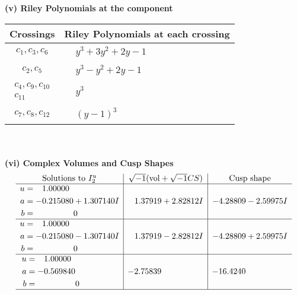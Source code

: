 \documentclass[1p]{elsarticle_modified}
\theoremstyle{definition}
\newcommand{\I}{\sqrt{-1}}
\begin{document}
\newpage\renewcommand{\arraystretch}{1}
\flushleft \textbf{(v) Riley Polynomials at the component}\newline \\
\begin{tabular}{m{50pt}|m{274pt}}
Crossings & \hspace{64pt}Riley Polynomials at each crossing \\
\hline $$\begin{aligned}c_{1},c_{3},c_{6}\end{aligned}$$&$\begin{aligned}
&y^3+3 y^2+2 y-1
\end{aligned}$\\
\hline $$\begin{aligned}c_{2},c_{5}\end{aligned}$$&$\begin{aligned}
&y^3- y^2+2 y-1
\end{aligned}$\\
\hline $$\begin{aligned}c_{4},c_{9},c_{10}\\c_{11}\end{aligned}$$&$\begin{aligned}
&y^3
\end{aligned}$\\
\hline $$\begin{aligned}c_{7},c_{8},c_{12}\end{aligned}$$&$\begin{aligned}
&(y-1)^3
\end{aligned}$\\
\hline
\end{tabular}\\~\\
\newpage\flushleft \textbf{(vi) Complex Volumes and Cusp Shapes}
$$\begin{array}{c|c|c}  
\text{Solutions to }I^u_{2}& \I (\text{vol} + \sqrt{-1}CS) & \text{Cusp shape}\\
 \hline 
\begin{aligned}
u &= \phantom{-}1.00000\phantom{ +0.000000I} \\
a &= -0.215080 + 1.307140 I \\
b &= \phantom{-0.000000 } 0\end{aligned}
 & \phantom{-}1.37919 + 2.82812 I & -4.28809 - 2.59975 I \\ \hline\begin{aligned}
u &= \phantom{-}1.00000\phantom{ +0.000000I} \\
a &= -0.215080 - 1.307140 I \\
b &= \phantom{-0.000000 } 0\end{aligned}
 & \phantom{-}1.37919 - 2.82812 I & -4.28809 + 2.59975 I \\ \hline\begin{aligned}
u &= \phantom{-}1.00000\phantom{ +0.000000I} \\
a &= -0.569840\phantom{ +0.000000I} \\
b &= \phantom{-0.000000 } 0\end{aligned}
 & -2.75839\phantom{ +0.000000I} & -16.4240\phantom{ +0.000000I}\\
 \hline 
 \end{array}$$\newpage
\end{document}
